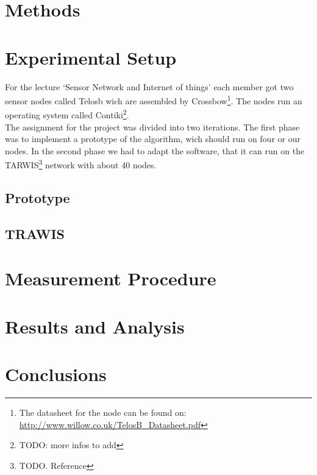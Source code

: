 \documentclass{llncs}
\begin{document}
\section{Methods}

\section{Experimental Setup}

For the lecture `Sensor Network and Internet of things' each member got two sensor nodes called Telosb wich are assembled by Crossbow\footnote{The datasheet for the node can be found on: \url{http://www.willow.co.uk/TelosB_Datasheet.pdf}}. The nodes run an operating system called Contiki\footnote{TODO: more infos to add}.\\
The assignment for the project was divided into two iterations. The first phase was to implement a prototype of the algorithm, wich should run on four or our nodes. In the second phase we had to adapt the software, that it can run on the TARWIS\footnote{TODO. Reference} network with about 40 nodes.

\subsection{Prototype}

\subsection{TRAWIS}

\section{Measurement Procedure}

\section{Results and Analysis}

\section{Conclusions}

{}



%
%
\end{document}
